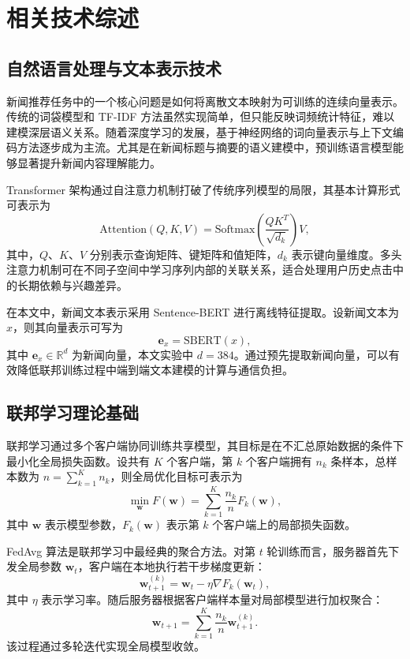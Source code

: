 \documentclass[UTF8,a4paper,12pt]{ctexart}
\numberwithin{equation}{section}
\begin{document}
\newpage
{}
\section{相关技术综述}
\subsection{自然语言处理与文本表示技术}
新闻推荐任务中的一个核心问题是如何将离散文本映射为可训练的连续向量表示。传统的词袋模型和 TF-IDF 方法虽然实现简单，但只能反映词频统计特征，难以建模深层语义关系。随着深度学习的发展，基于神经网络的词向量表示与上下文编码方法逐步成为主流。尤其是在新闻标题与摘要的语义建模中，预训练语言模型能够显著提升新闻内容理解能力。

Transformer 架构通过自注意力机制打破了传统序列模型的局限，其基本计算形式可表示为
\begin{equation}
\mathrm{Attention}(Q,K,V)=\mathrm{Softmax}\left(\frac{QK^{T}}{\sqrt{d_k}}\right)V,
\end{equation}
其中，$Q$、$K$、$V$ 分别表示查询矩阵、键矩阵和值矩阵，$d_k$ 表示键向量维度。多头注意力机制可在不同子空间中学习序列内部的关联关系，适合处理用户历史点击中的长期依赖与兴趣差异。

在本文中，新闻文本表示采用 Sentence-BERT 进行离线特征提取。设新闻文本为 $x$，则其向量表示可写为
\begin{equation}
\mathbf{e}_x=\mathrm{SBERT}(x),
\end{equation}
其中 $\mathbf{e}_x \in \mathbb{R}^{d}$ 为新闻向量，本文实验中 $d=384$。通过预先提取新闻向量，可以有效降低联邦训练过程中端到端文本建模的计算与通信负担。

\subsection{联邦学习理论基础}
联邦学习通过多个客户端协同训练共享模型，其目标是在不汇总原始数据的条件下最小化全局损失函数。设共有 $K$ 个客户端，第 $k$ 个客户端拥有 $n_k$ 条样本，总样本数为 $n=\sum_{k=1}^{K}n_k$，则全局优化目标可表示为
\begin{equation}
\min_{\mathbf{w}} F(\mathbf{w})=\sum_{k=1}^{K}\frac{n_k}{n}F_k(\mathbf{w}),
\end{equation}
其中 $\mathbf{w}$ 表示模型参数，$F_k(\mathbf{w})$ 表示第 $k$ 个客户端上的局部损失函数。

FedAvg 算法是联邦学习中最经典的聚合方法。对第 $t$ 轮训练而言，服务器首先下发全局参数 $\mathbf{w}_t$，客户端在本地执行若干步梯度更新：
\begin{equation}
\mathbf{w}_{t+1}^{(k)}=\mathbf{w}_{t}-\eta \nabla F_k(\mathbf{w}_t),
\end{equation}
其中 $\eta$ 表示学习率。随后服务器根据客户端样本量对局部模型进行加权聚合：
\begin{equation}
\mathbf{w}_{t+1}=\sum_{k=1}^{K}\frac{n_k}{n}\mathbf{w}_{t+1}^{(k)}.
\end{equation}
该过程通过多轮迭代实现全局模型收敛。
\end{document}
